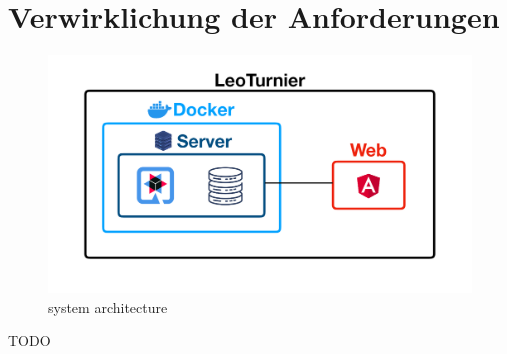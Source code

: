 \section{Verwirklichung der Anforderungen}

\begin{figure}[H]
    \centering
    \caption{system architecture}
    \includegraphics[scale=0.25]{pics/system_architecture.png}
\end{figure}

 TODO
